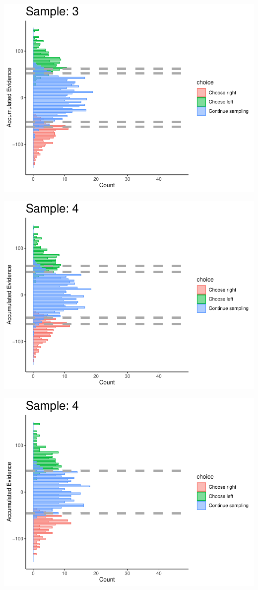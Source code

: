 \documentclass[
]{book}
\begin{document}
\begin{center}\includegraphics[width=0.8\linewidth]{LateNightBayes_files/figure-latex/collapsing_check-29} \end{center}

\begin{center}\includegraphics[width=0.8\linewidth]{LateNightBayes_files/figure-latex/collapsing_check-30} \end{center}

\begin{center}\includegraphics[width=0.8\linewidth]{LateNightBayes_files/figure-latex/collapsing_check-31} \end{center}
\end{document}
